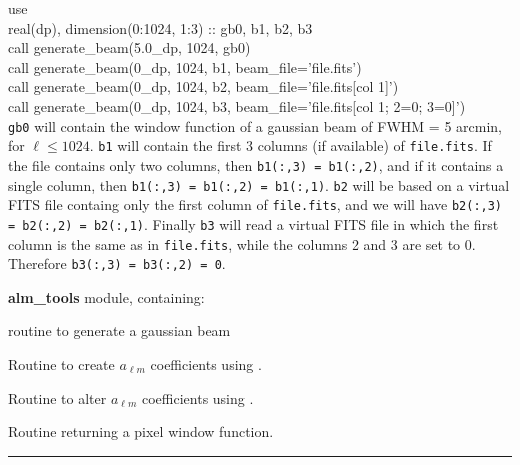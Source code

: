 
\begin{example}
{
use  \\
real(dp), dimension(0:1024, 1:3) :: gb0, b1, b2, b3\\
call generate\_beam(5.0\_dp, 1024, gb0)\\
call generate\_beam(0\_dp, 1024, b1, beam\_file='file.fits')\\
call generate\_beam(0\_dp, 1024, b2, beam\_file='file.fits[col 1]')\\
call generate\_beam(0\_dp, 1024, b3, beam\_file='file.fits[col 1; 2=0; 3=0]')\\
}
{%
{\tt gb0} will contain the window function of a gaussian beam of FWHM = 5 arcmin, for $\ell
\leq 1024$.
\newline
{\tt b1} will contain the first 3 columns (if available) of {\tt file.fits}. If
the file contains only two columns, then {\tt b1(:,3) = b1(:,2)}, and
if it contains a single column, then {\tt b1(:,3) = b1(:,2) = b1(:,1)}.
\newline
{\tt b2} will be
based on a virtual FITS file containg only the first column of {\tt file.fits},
and we will have {\tt b2(:,3) = b2(:,2) = b2(:,1)}. 
\newline
Finally {\tt b3} will read a
virtual FITS file in which the first column is the same as in {\tt file.fits},
while the columns 2 and 3 are set to 0. Therefore {\tt b3(:,3) = b3(:,2) = 0}.
}
\end{example}



\begin{modules}
  \begin{sulist}{} %
  \item[\textbf{alm\_tools}] module, containing:
	\item[\htmlref{gaussbeam}{sub:gaussbeam}] routine to generate a gaussian beam
  \end{sulist}
\end{modules}

\begin{related}
  \begin{sulist}{} %
  \item[\htmlref{create\_alm}{sub:create_alm}] Routine to create $a_{\ell m}$
  coefficients using \thedocid.
  \item[\htmlref{alter\_alm}{sub:alter_alm}] Routine to alter $a_{\ell m}$
  coefficients  using \thedocid.
  \item[\htmlref{pixel\_window}{sub:pixel_window}] Routine returning a pixel
  window function.
  \end{sulist}
\end{related}

\rule{\hsize}{2mm}

\newpage
